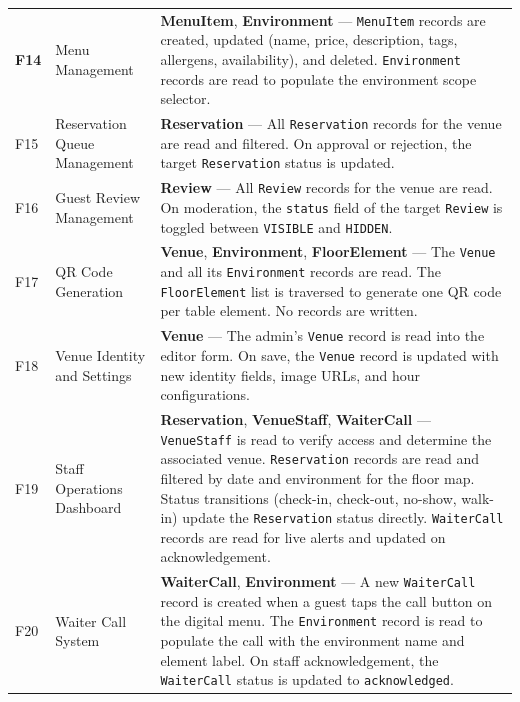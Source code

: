 \documentclass[12pt,a4paper]{article}
\begin{document}
\begin{longtable}{>{\bfseries}l L{4.5cm} L{7.5cm}}
    F14 &
    Menu Management &
    \textbf{MenuItem}, \textbf{Environment} ---
    \texttt{MenuItem} records are created, updated (name, price,
    description, tags, allergens, availability), and deleted.
    \texttt{Environment} records are read to populate the environment
    scope selector. \\
    \addlinespace

    F15 &
    Reservation Queue Management &
    \textbf{Reservation} ---
    All \texttt{Reservation} records for the venue are read and
    filtered. On approval or rejection, the target
    \texttt{Reservation} status is updated. \\
    \addlinespace

    F16 &
    Guest Review Management &
    \textbf{Review} ---
    All \texttt{Review} records for the venue are read. On moderation,
    the \texttt{status} field of the target \texttt{Review} is toggled
    between \texttt{VISIBLE} and \texttt{HIDDEN}. \\
    \addlinespace

    F17 &
    QR Code Generation &
    \textbf{Venue}, \textbf{Environment}, \textbf{FloorElement} ---
    The \texttt{Venue} and all its \texttt{Environment} records are
    read. The \texttt{FloorElement} list is traversed to generate one
    QR code per table element. No records are written. \\
    \addlinespace

    F18 &
    Venue Identity and Settings &
    \textbf{Venue} ---
    The admin's \texttt{Venue} record is read into the editor form.
    On save, the \texttt{Venue} record is updated with new identity
    fields, image URLs, and hour configurations. \\
    \addlinespace

    F19 &
    Staff Operations Dashboard &
    \textbf{Reservation}, \textbf{VenueStaff}, \textbf{WaiterCall} ---
    \texttt{VenueStaff} is read to verify access and determine the
    associated venue. \texttt{Reservation} records are read and
    filtered by date and environment for the floor map. Status
    transitions (check-in, check-out, no-show, walk-in) update the
    \texttt{Reservation} status directly.
    \texttt{WaiterCall} records are read for live alerts and updated
    on acknowledgement. \\
    \addlinespace

    F20 &
    Waiter Call System &
    \textbf{WaiterCall}, \textbf{Environment} ---
    A new \texttt{WaiterCall} record is created when a guest taps
    the call button on the digital menu. The \texttt{Environment}
    record is read to populate the call with the environment name
    and element label. On staff acknowledgement, the
    \texttt{WaiterCall} status is updated to \texttt{acknowledged}. \\

\end{longtable}
\end{document}
